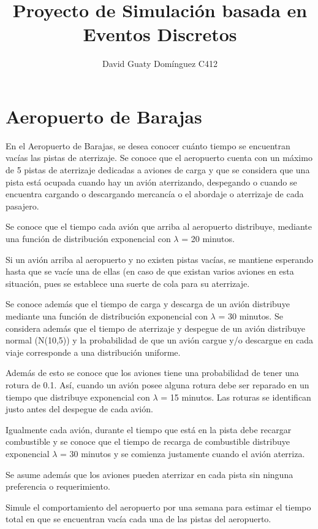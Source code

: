 \documentclass[12pt,letterpaper]{article}
\title{Proyecto de Simulación basada en Eventos Discretos}
\author{David Guaty Dom\'inguez C412}
\date{}
\begin{document}
\maketitle

\section*{Aeropuerto de Barajas}
En el Aeropuerto de Barajas, se desea conocer cuánto tiempo se encuentran vac\'ias las pistas de aterrizaje. Se conoce que el aeropuerto cuenta con un máximo de 5 pistas de aterrizaje dedicadas a aviones de carga y que se considera que una pista está ocupada cuando hay un avión aterrizando, despegando o cuando se encuentra cargando o descargando mercanc\'ia o el abordaje o aterrizaje de cada pasajero.

Se conoce que el tiempo cada avión que arriba al aeropuerto distribuye,
mediante una función de distribución exponencial con $\lambda$ = 20 minutos.

Si un avión arriba al aeropuerto y no existen pistas vac\'ias, se mantiene
esperando hasta que se vac\'ie una de ellas (en caso de que existan varios aviones
en esta situación, pues se establece una suerte de cola para su aterrizaje.

Se conoce además que el tiempo de carga y descarga de un avión distribuye mediante una función de distribución exponencial con $\lambda$ = 30 minutos. Se considera además que el tiempo de aterrizaje y despegue de un avión distribuye normal (N(10,5)) y la probabilidad de que un avión cargue y/o descargue en cada viaje corresponde a una distribución uniforme.

Además de esto se conoce que los aviones tiene una probabilidad de tener
una rotura de 0.1. As\'i, cuando un avión posee alguna rotura debe ser reparado en un tiempo que distribuye exponencial con $\lambda$ = 15 minutos. Las roturas se identifican justo antes del despegue de cada avión. 

Igualmente cada avión, durante el tiempo que está en la pista debe recargar combustible y se conoce que el tiempo de recarga de combustible distribuye exponencial $\lambda$ = 30 minutos y se comienza justamente cuando el avión aterriza.

Se asume además que los aviones pueden aterrizar en cada pista sin ninguna preferencia o requerimiento.

Simule el comportamiento del aeropuerto por una semana para estimar el
tiempo total en que se encuentran vac\'ia cada una de las pistas del aeropuerto.
\end{document}
